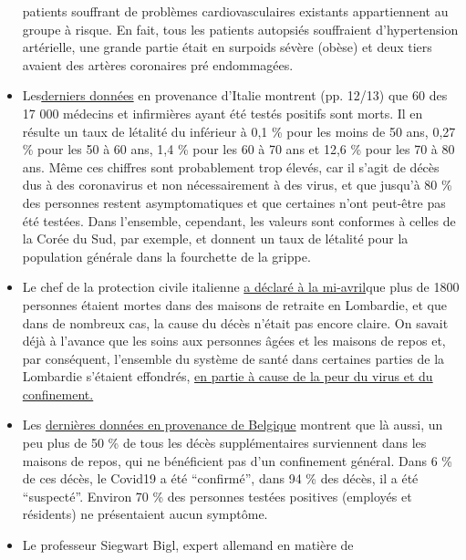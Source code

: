 \begin{itemize}
  patients souffrant de problèmes cardiovasculaires existants
  appartiennent au groupe à risque. En fait, tous les patients autopsiés
  souffraient d'hypertension artérielle, une grande partie était en
  surpoids sévère (obèse) et deux tiers avaient des artères coronaires
  pré endommagées.
\item
  Les\href{https://www.epicentro.iss.it/coronavirus/bollettino/Bollettino-sorveglianza-integrata-COVID-19_16-aprile-2020.pdf\#page=13}{derniers
  données} en provenance d'Italie montrent (pp. 12/13) que 60 des 17 000
  médecins et infirmières ayant été testés positifs sont morts. Il en
  résulte un taux de létalité du inférieur à 0,1 \% pour les moins de 50
  ans, 0,27 \% pour les 50 à 60 ans, 1,4 \% pour les 60 à 70 ans et 12,6
  \% pour les 70 à 80 ans. Même ces chiffres sont probablement trop
  élevés, car il s'agit de décès dus à des coronavirus et non
  nécessairement à des virus, et que jusqu'à 80 \% des personnes restent
  asymptomatiques et que certaines n'ont peut-être pas été testées. Dans
  l'ensemble, cependant, les valeurs sont conformes à celles de la Corée
  du Sud, par exemple, et donnent un taux de létalité pour la population
  générale dans la fourchette de la grippe.
\item
  Le chef de la protection civile italienne
  \href{https://www.theguardian.com/world/2020/apr/16/italian-police-broaden-care-home-coronavirus-milan}{a
  déclaré à la mi-avril}que plus de 1800 personnes étaient mortes dans
  des maisons de retraite en Lombardie, et que dans de nombreux cas, la
  cause du décès n'était pas encore claire. On savait déjà à l'avance
  que les soins aux personnes âgées et les maisons de repos et, par
  conséquent, l'ensemble du système de santé dans certaines parties de
  la Lombardie s'étaient effondrés,
  \href{https://swprs.org/covid-19-a-report-from-italy/}{en partie à
  cause de la peur du virus et du confinement.}
\item
  Les
  \href{https://covid-19.sciensano.be/sites/default/files/Covid19/Meest\%20recente\%20update.pdf}{dernières
  données en provenance de Belgique} montrent que là aussi, un peu plus
  de 50 \% de tous les décès supplémentaires surviennent dans les
  maisons de repos, qui ne bénéficient pas d'un confinement général.
  Dans 6 \% de ces décès, le Covid19 a été ``confirmé'', dans 94 \% des
  décès, il a été ``suspecté''. Environ 70 \% des personnes testées
  positives (employés et résidents) ne présentaient aucun symptôme.
\item
  Le professeur Siegwart Bigl, expert allemand en matière de

\end{itemize}
